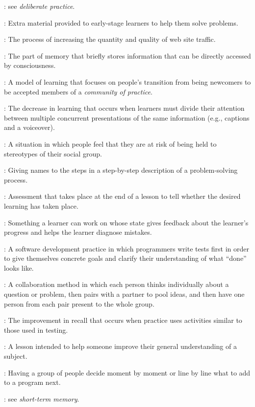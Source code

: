 \begin{description}
: see \emph{deliberate
  practice}.

: Extra material provided to early-stage
learners to help them solve problems.

: The process of increasing the
quantity and quality of web site traffic.

: The part of memory that briefly
stores information that can be directly accessed by consciousness.

: A model of learning that focuses
on people's transition from being newcomers to be accepted members of a
\emph{community of practice}.

: The decrease in
learning that occurs when learners must divide their attention between multiple
concurrent presentations of the same information (e.g., captions and a
voiceover).

: A situation in which people feel
that they are at risk of being held to stereotypes of their social group.

: Giving names to the steps in a
step-by-step description of a problem-solving process.

: Assessment that takes
place at the end of a lesson to tell whether the desired learning has taken
place.

: Something a learner can work on
whose state gives feedback about the learner's progress and helps the learner
diagnose mistakes.

: A software
development practice in which programmers write tests first in order to give
themselves concrete goals and clarify their understanding of what ``done'' looks
like.

: A collaboration method in which
each person thinks individually about a question or problem, then pairs with a
partner to pool ideas, and then have one person from each pair present to the
whole group.

: The
improvement in recall that occurs when practice uses activities similar to those
used in testing.

: A lesson intended to help someone improve their
general understanding of a subject.

: Having a group of people decide moment
by moment or line by line what to add to a program next.

: see \emph{short-term memory}.

\end{description}
